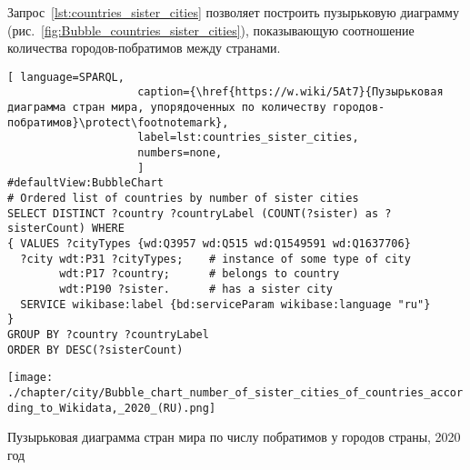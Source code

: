 Запрос~\ref{lst:countries_sister_cities} позволяет построить 
пузырьковую диаграмму (рис.~\ref{fig:Bubble_countries_sister_cities}), 
показывающую соотношение количества городов-побратимов между странами.


\begin{lstlisting}[ language=SPARQL, 
                    caption={\href{https://w.wiki/5At7}{Пузырьковая диаграмма стран мира, упорядоченных по количеству городов-побратимов}\protect\footnotemark},
                    label=lst:countries_sister_cities,
                    numbers=none,
                    ]
#defaultView:BubbleChart
# Ordered list of countries by number of sister cities
SELECT DISTINCT ?country ?countryLabel (COUNT(?sister) as ?sisterCount) WHERE
{ VALUES ?cityTypes {wd:Q3957 wd:Q515 wd:Q1549591 wd:Q1637706}
  ?city wdt:P31 ?cityTypes;    # instance of some type of city
        wdt:P17 ?country;      # belongs to country
        wdt:P190 ?sister.      # has a sister city
  SERVICE wikibase:label {bd:serviceParam wikibase:language "ru"}
}
GROUP BY ?country ?countryLabel
ORDER BY DESC(?sisterCount)
\end{lstlisting}


\begin{marginfigure}[-1.5cm]
    \texttt{[image: ./chapter/city/Bubble\_chart\_number\_of\_sister\_cities\_of\_countries\_according\_to\_Wikidata,\_2020\_(RU).png]}
\caption[Пузырьковая диаграмма стран мира по числу побратимов у городов, 2020 год.]
    {Пузырьковая диаграмма стран мира по числу побратимов у городов страны, 2020 год}%
  \label{fig:Bubble_countries_sister_cities}%
\end{marginfigure}



